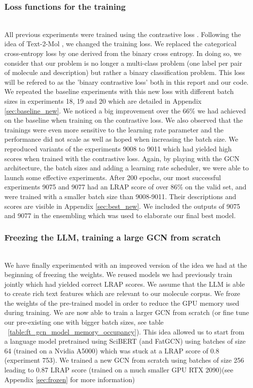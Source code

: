 \subsubsection*{Loss functions for the training}
\hfill \\
All previous experiments were trained using the contrastive loss .
Following the idea of Text-2-Mol \cite{text2mol}, we changed the training loss. We replaced the categorical cross-entropy loss by one derived from the binary cross entropy. In doing so, we consider that our problem is no longer a multi-class problem (one label per pair of molecule and description) but rather a binary classification problem. This loss will be refered to as the 'binary contrastive loss' both in this report and our code. 
We repeated the baseline experiments with this new loss with different batch sizes in experiments 18, 19 and 20 which are detailed in Appendix \ref{sec:baseline_new}. We noticed a big improvement over the 66\% we had achieved on the baseline when training on the contrastive loss. We also observed that the trainings were even more sensitive to the learning rate parameter and the performance did not scale as well as hoped when increasing the batch size. 
\newline
We reproduced variants of the experiments 9008 to 9011 which had yielded high scores when trained with the contrastive loss. Again, by playing with the GCN architecture, the batch sizes and adding a learning rate scheduler, we were able to launch some effective experiments.  After 200 epochs, our most successful experiments 9075 and 9077 had an LRAP score of over 86\% on the valid set, and were trained with a smaller batch size than 9008-9011. Their descriptions and scores are visible in Appendix \ref{sec:best_new}.
We included the outputs of 9075 and 9077 in the ensembling which was used to elaborate our final best model.

\subsubsection*{Freezing the LLM, training a large GCN from scratch} \hfill\\
We have finally experimented with an improved version of the idea we had at the beginning of freezing the weights. We reused models we had previously train jointly which had yielded correct LRAP scores. We assume that the LLM is able to create rich text features which are relevant to our molecule corpus. We froze the weights of the pre-trained model in order to reduce the GPU memory used during training. We are now able to train a larger GCN from scratch (or fine tune our pre-existing one with bigger batch sizes, see table ~\ref{table:ft_gcn_model_memory_occupancy}). This idea allowed us to start from a language model pretrained using SciBERT (and FatGCN) using batches of size 64 (trained on a Nvidia A5000) which was stuck at a LRAP score of 0.8 (experiment 753). We trained a new GCN from scratch using batches of size 256 leading to 0.87 LRAP score (trained on a much smaller GPU RTX 2090)(see Appendix \ref{sec:frozen} for more information)

